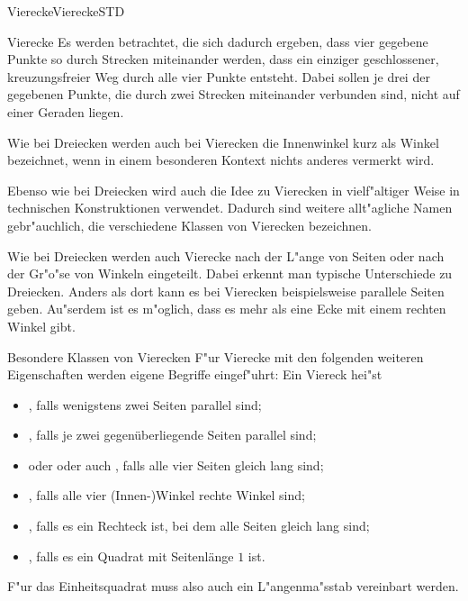 \begin{MXContent}{Vierecke}{Vierecke}{STD}
\begin{MXInfo}{Vierecke}%
Es werden  betrachtet, die sich dadurch ergeben,
dass vier gegebene Punkte so durch Strecken miteinander werden, dass ein
einziger geschlossener, kreuzungsfreier Weg durch alle vier Punkte entsteht.
Dabei sollen je drei der gegebenen Punkte, die durch zwei Strecken miteinander 
verbunden sind, nicht auf einer Geraden liegen.

Wie bei Dreiecken werden auch bei Vierecken die Innenwinkel kurz als Winkel 
bezeichnet, wenn in einem besonderen Kontext nichts anderes vermerkt wird.
\end{MXInfo}

Ebenso wie bei Dreiecken wird auch die Idee zu Vierecken in vielf"altiger Weise 
in technischen Konstruktionen verwendet. Dadurch sind weitere allt"agliche Namen 
gebr"auchlich, die verschiedene Klassen von Vierecken bezeichnen.

Wie bei Dreiecken werden auch Vierecke nach der L"ange von Seiten oder nach der 
Gr"o"se von Winkeln eingeteilt. Dabei erkennt man typische Unterschiede zu 
Dreiecken. Anders als dort kann es bei Vierecken beispielsweise parallele Seiten 
geben. Au"serdem ist es m"oglich, dass es mehr als eine Ecke mit einem rechten 
Winkel gibt.

\begin{MXInfo}{Besondere Klassen von Vierecken}%
F"ur Vierecke mit den folgenden weiteren Eigenschaften werden eigene Begriffe 
eingef"uhrt: Ein Viereck hei"st
\begin{itemize}
\item {}, falls wenigstens zwei Seiten parallel sind;
\item {}, falls je zwei 
 gegen\"uberliegende Seiten parallel sind;
\item {} oder 
  oder 
 auch , falls alle vier Seiten gleich lang sind;
\item {}, falls alle vier (Innen-)Winkel rechte 
 Winkel sind;
\item {}, falls es ein Rechteck ist, bei dem alle 
 Seiten gleich lang sind;
\item {}, falls es ein Quadrat mit 
 Seitenl\"ange $1$ ist.
\end{itemize}
\end{MXInfo}
F"ur das Einheitsquadrat muss also auch ein L"angenma"sstab vereinbart werden.


\end{MXContent}
